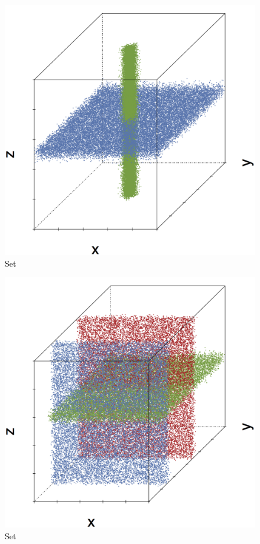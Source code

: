\begin{subfigure}{0.18\textwidth}
	\centering
	\includegraphics[width=\textwidth]{3/img/datasetplot_ferdosi_4_60000.png}
	\caption{Set \ferdosiFour}
	\label{fig:3:simulated:datasets:ferdosi4}
\end{subfigure}
\begin{subfigure}{0.18\textwidth}
	\centering
	\includegraphics[width=\textwidth]{3/img/datasetplot_ferdosi_5_60000.png}
	\caption{Set \ferdosiFive}
	\label{fig:3:simulated:datasets:ferdosi5}
\end{subfigure}	